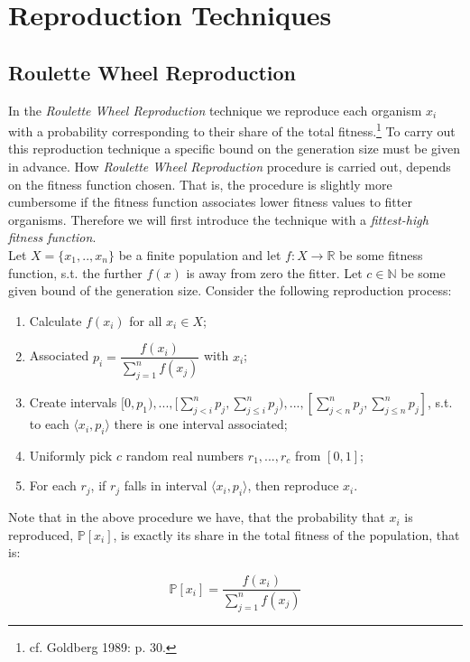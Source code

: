 \documentclass[a4paper]{article}
\newcommand{\lp}{\langle}
\newcommand{\rp}{\rangle}
\newcommand{\Prob}[1]{\mathbb{P}[#1]}
\theoremstyle{dotless}
\begin{document}
\section{Reproduction Techniques}

\subsection{Roulette Wheel Reproduction}

In the \textit{Roulette Wheel Reproduction} technique we reproduce each organism $x_i$ with a probability corresponding to their share of the total fitness.\footnote{cf. Goldberg 1989: p. 30.} To carry out this reproduction technique a specific bound on the generation size must be given in advance. How \emph{Roulette Wheel Reproduction} procedure is carried out, depends on the fitness function chosen. That is, the procedure is slightly more cumbersome if the fitness function associates lower fitness values to fitter organisms. Therefore we will first introduce the technique with a \emph{fittest-high fitness function}.\\

Let $X=\{x_1,..,x_n \}$ be a finite population and let $f: X \rightarrow \mathbb{R}$ be some fitness function, s.t. the further $f(x)$ is away from zero the fitter. Let $c \in \mathbb{N}$ be some given bound of the generation size. Consider the following reproduction process:

	\begin{enumerate}
	\item Calculate $f(x_i)$ for all $x_i \in X$;
	\item Associated $p_i = \dfrac{f(x_i)}{\sum^n_{j=1} f(x_j)}$ with $x_i$;
	\item  Create intervals $[0,p_1),...,[ \sum^n_{j<i} p_j, \sum^n_{j \leq i} p_j ),..., [\sum^n_{j<n} p_j, \sum^n_{j \leq n} p_j ]$, s.t. to each $\lp x_i,p_i \rp$ there is one interval associated;
	\item Uniformly pick $c$ random real numbers $r_1,...,r_c$ from $[0,1]$;
	\item For each $r_j$, if $r_j$ falls in interval $\lp x_i,p_i \rp$, then reproduce $x_i$.
	\end{enumerate}
	
Note that in the above procedure we have, that the probability that $x_i$ is reproduced, $\Prob{x_i}$, is exactly its share in the total fitness of the population, that is:

\begin{equation}
\Prob{x_i} = \dfrac{f(x_i)}{\sum^n_{j=1} f(x_j)}
\end{equation}
\end{document}
